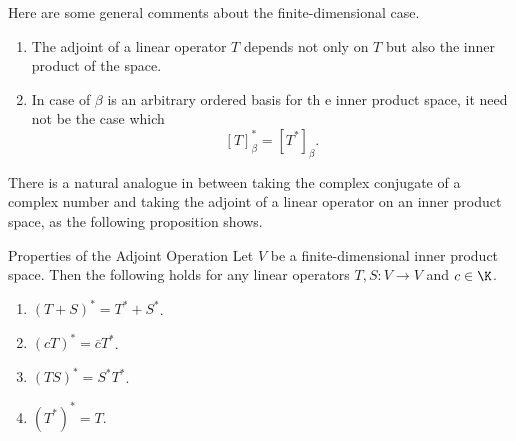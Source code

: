 \documentclass[linearalgebra]{subfiles}
\begin{document}
    \begin{remark}
        Here are some general comments about the finite-dimensional case.
        \begin{enumerate}
            \item The adjoint of a linear operator $T$ depends not only on $T$ but also the inner product of the space.
            \item In case of $\beta$ is an arbitrary ordered basis for th e inner product space, it need not be the case which
                \begin{equation*}
                    \left[ T \right] _\beta^* = \left[ T^* \right] _\beta.
                \end{equation*}
        \end{enumerate}
    \end{remark}

    \begin{remark}
        There is a natural analogue in between taking the complex conjugate of a complex number and taking the adjoint of a linear operator on an inner product space, as the following proposition shows.
    \end{remark}

    \begin{prop}{Properties of the Adjoint Operation}
        Let $V$ be a finite-dimensional inner product space. Then the following holds for any linear operators $T,S:V\to V$ and $c\in\K$.
        \begin{enumerate}
            \item $\left( T+S \right) ^* = T^* + S^*$.
            \item $\left( cT \right) ^* = \overline{c} T^*$.
            \item $\left( TS \right) ^* = S^*T^*$. 
            \item $\left( T^* \right) ^* = T$.
        \end{enumerate}
    \end{prop}
\end{document}
